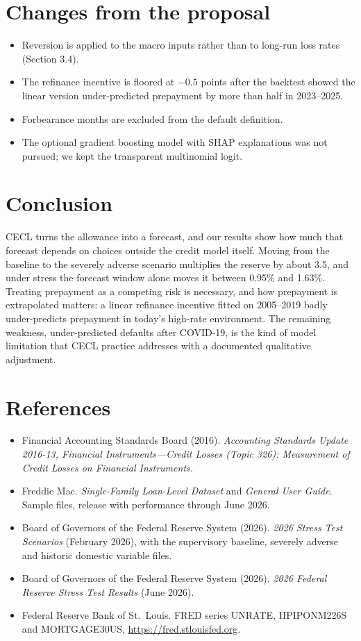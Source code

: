 \documentclass[11pt]{article}
\begin{document}
\section{Changes from the proposal}
\begin{itemize}
  \item Reversion is applied to the macro inputs rather than to long-run loss rates (Section 3.4).
  \item The refinance incentive is floored at $-0.5$ points after the backtest showed the linear version under-predicted
        prepayment by more than half in 2023--2025.
  \item Forbearance months are excluded from the default definition.
  \item The optional gradient boosting model with SHAP explanations was not pursued; we kept the transparent
        multinomial logit.
\end{itemize}

\section{Conclusion}
CECL turns the allowance into a forecast, and our results show how much that forecast depends on choices outside the
credit model itself. Moving from the baseline to the severely adverse scenario multiplies the reserve by about 3.5,
and under stress the forecast window alone moves it between 0.95\% and 1.63\%. Treating prepayment as a competing risk
is necessary, and how prepayment is extrapolated matters: a linear refinance incentive fitted on 2005--2019 badly
under-predicts prepayment in today's high-rate environment. The remaining weakness, under-predicted defaults after
COVID-19, is the kind of model limitation that CECL practice addresses with a documented qualitative adjustment.

\section*{References}
\begin{itemize}
  \item Financial Accounting Standards Board (2016). \emph{Accounting Standards Update 2016-13, Financial Instruments---Credit
        Losses (Topic 326): Measurement of Credit Losses on Financial Instruments.}
  \item Freddie Mac. \emph{Single-Family Loan-Level Dataset} and \emph{General User Guide}. Sample files, release with
        performance through June 2026.
  \item Board of Governors of the Federal Reserve System (2026). \emph{2026 Stress Test Scenarios} (February 2026), with
        the supervisory baseline, severely adverse and historic domestic variable files.
  \item Board of Governors of the Federal Reserve System (2026). \emph{2026 Federal Reserve Stress Test Results} (June 2026).
  \item Federal Reserve Bank of St.\ Louis. FRED series UNRATE, HPIPONM226S and MORTGAGE30US, \url{https://fred.stlouisfed.org}.
\end{itemize}
\end{document}
